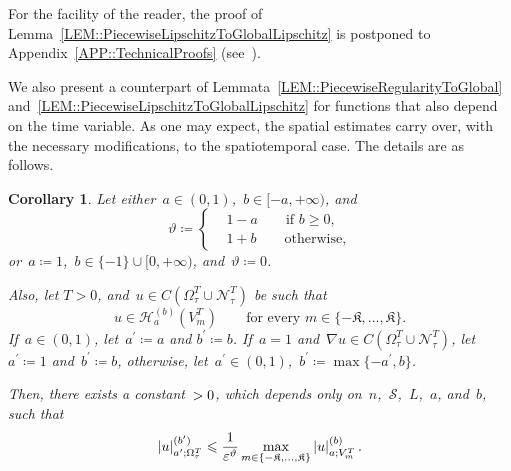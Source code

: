 \documentclass[12pt,a4paper]{amsart}
\makeatletter
\numberwithin{equation}{section}
\newtheorem{corollary}[theorem]{Corollary}
\theoremstyle{definition}
\theoremstyle{remark}
\newcommand{\eps}{\varepsilon}
\newcommand{\abs}[1]{\left\lvert#1\right\rvert}
\renewcommand{\leq}{\leqslant}
\renewcommand{\geq}{\geqslant}
\newcommand{\const}[1]{%
  \csname const@#1\endcsname%
}
\makeatother
\begin{document}
For the facility of the reader, the proof of Lemma~\ref{LEM::PiecewiseLipschitzToGlobalLipschitz} is postponed to Appendix~\ref{APP::TechnicalProofs} (see~).

We also present a counterpart of Lemmata~\ref{LEM::PiecewiseRegularityToGlobal} and~\ref{LEM::PiecewiseLipschitzToGlobalLipschitz} for functions that also depend on the time variable. As one may expect, the spatial estimates carry over, with the necessary modifications, to the spatiotemporal case. The details are as follows.

\begin{corollary}\label{COR::PiecewiseRegularityToGlobalWithTime}
    Let either~$a \in (0,1)$,~$b \in [-a,+\infty)$, and %
    \begin{equation}
        \vartheta \coloneq \left\{\begin{aligned}
            &1-a\qquad\text{if }b\geq 0,\\
            &1+b\qquad\text{otherwise,}
        \end{aligned}\right.
    \end{equation}
    or~$a \coloneq 1$,~$b \in \{-1\}\cup [0,+\infty)$, and~$\vartheta \coloneq 0$. %
    
    Also, let $T>0$, and~$u \in C(\Omega_\tau^T \cup \mathcal{N}_\tau^T)$ be such that 
    \begin{equation}
        u \in \mathcal{H}_a^{(b)}(V_m^T)\qquad \text{for every }m \in \{-\mathfrak{K},\dots,\mathfrak{K}\}.
    \end{equation}
    If~$a \in (0,1)$, let~$a^\prime \coloneq a$ and $b^\prime \coloneq b$. If~$a = 1$ and~$\nabla u \in C(\Omega_\tau^T \cup \mathcal{N}_\tau^T)$, let~$a^\prime \coloneq 1$ and~$b^\prime \coloneq b$, otherwise, let~$a^\prime \in (0,1)$,~$b^\prime \coloneq \max\{-a^\prime, b\}$.
    
    Then, there exists a constant~$\const{CONST::PiecewiseRegularityToGlobalWithTime}>0$, which depends only on~$n$,~$\mathcal{S}$,~$L$,~$a$, and~$b$, such that
    \begin{equation}\label{EQ::PiecewiseRegularityToGlobalWithTime}
        \abs{u}_{a^\prime; \Omega_\tau^T}^{(b^\prime)} \leq \const{CONST::PiecewiseRegularityToGlobalWithTime} \frac{1}{\eps^{\vartheta}}\max_{m \in \{-\mathfrak{K},\dots,\mathfrak{K}\}} \abs{u}_{a; V_m^T}^{(b)}.
    \end{equation}
\end{corollary}
\end{document}
